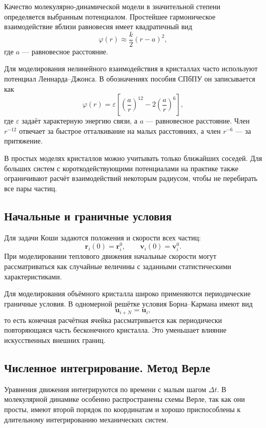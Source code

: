 Качество молекулярно-динамической модели в значительной степени определяется
выбранным потенциалом. Простейшее гармоническое взаимодействие вблизи
равновесия имеет квадратичный вид
\[
    \varphi(r)\approx
    \frac{k}{2}(r-a)^2,
\]
где $a$ --- равновесное расстояние.

Для моделирования нелинейного взаимодействия в кристаллах часто используют
потенциал Леннарда--Джонса. В обозначениях пособия СПбПУ он записывается как
\[
    \varphi(r)=\varepsilon
    \left[\left(\frac{a}{r}\right)^{12}
          -2\left(\frac{a}{r}\right)^6\right],
\]
где $\varepsilon$ задаёт характерную энергию связи, а $a$ --- равновесное
расстояние. Член $r^{-12}$ отвечает за быстрое отталкивание на малых расстояниях,
а член $r^{-6}$ --- за притяжение.

В простых моделях кристаллов можно учитывать только ближайших соседей. Для
больших систем с короткодействующими потенциалами на практике также ограничивают
расчёт взаимодействий некоторым радиусом, чтобы не перебирать все пары частиц.

\subsection{Начальные и граничные условия}

Для задачи Коши задаются положения и скорости всех частиц:
\[
    \mathbf r_i(0)=\mathbf r_i^0,
    \qquad
    \mathbf v_i(0)=\mathbf v_i^0.
\]
При моделировании теплового движения начальные скорости могут рассматриваться
как случайные величины с заданными статистическими характеристиками.

Для моделирования объёмного кристалла широко применяются периодические
граничные условия. В одномерной решётке условия Борна--Кармана имеют вид
\[
    \mathbf u_{i+N}=\mathbf u_i,
\]
то есть конечная расчётная ячейка рассматривается как периодически повторяющаяся
часть бесконечного кристалла. Это уменьшает влияние искусственных внешних
границ.

\subsection{Численное интегрирование. Метод Верле}

Уравнения движения интегрируются по времени с малым шагом $\Delta t$. В
молекулярной динамике особенно распространены схемы Верле, так как они просты,
имеют второй порядок по координатам и хорошо приспособлены к длительному
интегрированию механических систем.

